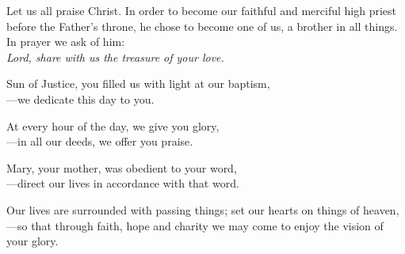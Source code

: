 \intercessions

\begin{raggedright}
Let us all praise Christ. In order to become our faithful and merciful high priest before the Father’s throne, he chose to become one of us, a brother in all things. In prayer we ask of him:\\
\emph{Lord, share with us the treasure of your love.}

\medskip
Sun of Justice, you filled us with light at our baptism,\\
{\color{red}---}we dedicate this day to you.

\medskip
At every hour of the day, we give you glory,\\
{\color{red}---}in all our deeds, we offer you praise.

\medskip
Mary, your mother, was obedient to your word,\\
{\color{red}---}direct our lives in accordance with that word.

\medskip
Our lives are surrounded with passing things; set our hearts on things of heaven,\\
{\color{red}---}so that through faith, hope and charity we may come to enjoy the vision of your glory.
\end{raggedright}